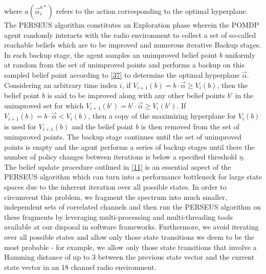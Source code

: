 \documentclass[10pt,twocolumn]{IEEEtran}
\begin{document}
where $a(\vec{\alpha}_i^{u*})$ refers to the action corresponding to the optimal hyperplane. The PERSEUS algorithm constitutes an Exploration phase wherein the POMDP agent randomly interacts with the radio environment to collect a set of so-called reachable beliefs which are to be improved and numerous iterative Backup stages. In each backup stage, the agent samples an unimproved belief point $b$ uniformly at random from the set of unimproved points and performs a backup on this sampled belief point according to \eqref{37} to determine the optimal hyperplane $\vec{\alpha}$. Considering an arbitrary time index $i$, if $V_{i+1}(b) = b \cdot \vec{\alpha} \geq V_{i}(b)$, then the belief point $b$ is said to be improved along with any other belief points $b'$ in the unimproved set for which $V_{i+1}(b') = b' \cdot \vec{\alpha} \geq V_{i}(b')$. If $V_{i+1}(b) = b \cdot \vec{\alpha} < V_{i}(b)$, then a copy of the maximizing hyperplane for $V_i(b)$ is used for $V_{i+1}(b)$ and the belief point $b$ is then removed from the set of unimproved points. The backup stage continues until the set of unimproved points is empty and the agent performs a series of backup stages until there the number of policy changes between iterations is below a specified threshold $\eta$.
\\The belief update procedure outlined in \eqref{11} is an essential aspect of the PERSEUS algorithm which can turn into a performance bottleneck for large state spaces due to the inherent iteration over all possible states. In order to circumvent this problem, we fragment the spectrum into much smaller, independent sets of correlated channels and then run the PERSEUS algorithm on these fragments by leveraging multi-processing and multi-threading tools available at our disposal in software frameworks. Furthermore, we avoid iterating over all possible states and allow only those state transitions we deem to be the most probable - for example, we allow only those state transitions that involve a Hamming distance of up to 3 between the previous state vector and the current state vector in an 18 channel radio environment.
\end{document}
